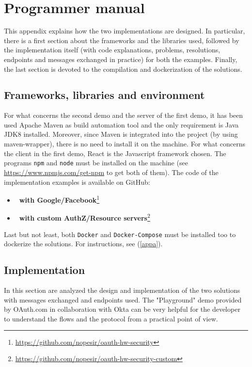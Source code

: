 
\chapter{Programmer manual}
This appendix explains how the two implementations are designed. In particular, there is a first section about the frameworks and the libraries used, followed by the implementation itself (with code explanations, problems, resolutions, endpoints and messages exchanged in practice) for both the examples. Finally, the last section is devoted to the compilation and dockerization of the solutions.

\minitoc

\section{Frameworks, libraries and environment}
For what concerns the second demo and the server of the first demo, it has been used Apache Maven as build automation tool and the only requirement is Java JDK8 installed. Moreover, since Maven is integrated into the project (by using maven-wrapper), there is no need to install it on the machine.
For what concerns the client in the first demo, React is the Javascript framework chosen. The programs \texttt{npm} and \texttt{node} must be installed on the machine (see \url{https://www.npmjs.com/get-npm} to get both of them). 
The code of the implementation examples is available on GitHub:

\begin{itemize}
    \item \textbf{\oauth\ with Google/Facebook}\footnote{\url{https://github.com/nopesir/oauth-hw-security}}
    \item \textbf{\oauth\ with custom AuthZ/Resource servers}\footnote{\url{https://github.com/nopesir/oauth-hw-security-custom}}
\end{itemize}

Last but not least, both \texttt{Docker} and \texttt{Docker-Compose} must be installed too to dockerize the solutions. For instructions, see (\ref{appa}).

\section{Implementation}
In this section are analyzed the design and implementation of the two solutions with messages exchanged and endpoints used. The "Playground" demo provided by OAuth.com in collaboration with Okta \cite{playgr} can be very helpful for the developer to understand the flows and the protocol from a practical point of view. 


